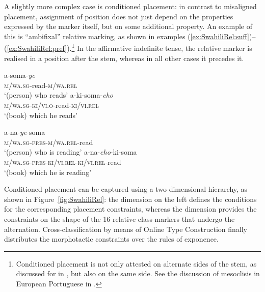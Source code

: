 \documentclass[output=paper
 	        ,biblatex
                ,babelshorthands
                ,newtxmath
                ,draftmode
                ,colorlinks, citecolor=brown
]{langscibook}
\begin{document}
\begin{exe}
\begin{xlist}
\begin{exe}
\begin{xlist}
A slightly more complex case is conditioned placement: in contrast to
misaligned placement, assignment of position does not just depend on
the properties expressed by the marker itself, but on some additional
property. An example of this is  ``ambifixal'' relative
marking, as shown in examples
(\ref{ex:SwahiliRel:suff})--(\ref{ex:SwahiliRel:pref}).\footnote{Conditioned
  placement is not only attested on alternate sides of the stem, as
  discussed for  in \citet{Stump93}, but also on the same
  side. See the discussion of mesoclisis in European Portuguese in
  \citet{Crysmann:Bonami:2016}.} In the affirmative indefinite tense,
the relative marker is realised in a position after the stem, whereas
in all other cases it precedes it. 

\begin{exe}
  \ex\label{ex:SwahiliRel:suff}
  \begin{xlist}
    \ex\gll  a-soma-\textit{ye}\\
    \textsc{m/wa.sg}-read\textsc{-m/wa.rel}\\
    \glt `(person) who reads'
    \ex\gll a-ki-soma-\textit{cho}\\
    \textsc{m/wa.sg}-\textsc{ki/vi.o}-read-\textsc{ki/vi.rel}\\
    \glt `(book) which he reads'
  \end{xlist}
  \ex\label{ex:SwahiliRel:pref}
  \begin{xlist}
    \ex\gll  a-na-\textit{ye}-soma\\
    \textsc{m/wa.sg-pres-m/wa.rel}-read\\
    \glt `(person) who is reading'
    \ex\gll a-na-\textit{cho}-ki-soma\\
    \textsc{m/wa.sg-pres-ki/vi.rel-ki/vi.rel}-read\\
    \glt `(book) which he is reading'
  \end{xlist}
\end{exe}

Conditioned placement can be captured using a two-dimensional
hierarchy, as shown in Figure~\ref{fig:SwahiliRel}: the
 dimension on the left defines the conditions for
the corresponding placement constraints, whereas the 
dimension provides the constraints on the shape of the 16 relative
class markers that undergo the alternation.  Cross-classification by
means of Online Type Construction finally distributes the morphotactic
constraints over the rules of exponence.
  


\end{xlist}
\end{exe}
\end{xlist}
\end{exe}
\end{document}
